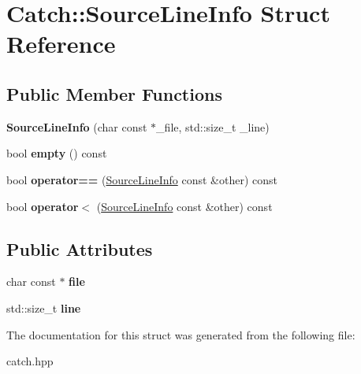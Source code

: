 \hypertarget{structCatch_1_1SourceLineInfo}{}\section{Catch\+:\+:Source\+Line\+Info Struct Reference}
\label{structCatch_1_1SourceLineInfo}
\subsection*{Public Member Functions}
\begin{DoxyCompactItemize}
\item 
\mbox{\label{structCatch_1_1SourceLineInfo_a6218cb890337d37f708ea94063958940}} 
{\bfseries Source\+Line\+Info} (char const $\ast$\+\_\+file, std\+::size\+\_\+t \+\_\+line)
\item 
\mbox{\label{structCatch_1_1SourceLineInfo_a05ab6444e9de7e9c3e76d8aa00093c3a}} 
bool {\bfseries empty} () const
\item 
\mbox{\label{structCatch_1_1SourceLineInfo_a688e761986879266658f000f14ab8a42}} 
bool {\bfseries operator==} (\hyperlink{structCatch_1_1SourceLineInfo}{Source\+Line\+Info} const \&other) const
\item 
\mbox{\label{structCatch_1_1SourceLineInfo_a8b99a0d7b1553d8c2298c694db924be3}} 
bool {\bfseries operator$<$} (\hyperlink{structCatch_1_1SourceLineInfo}{Source\+Line\+Info} const \&other) const
\end{DoxyCompactItemize}
\subsection*{Public Attributes}
\begin{DoxyCompactItemize}
\item 
\mbox{\label{structCatch_1_1SourceLineInfo_ad65537703e9f08c1fa7777fbc3f0c617}} 
char const  $\ast$ {\bfseries file}
\item 
\mbox{\label{structCatch_1_1SourceLineInfo_a841e5d696c7b9cde24e45e61dd979c77}} 
std\+::size\+\_\+t {\bfseries line}
\end{DoxyCompactItemize}


The documentation for this struct was generated from the following file\+:\begin{DoxyCompactItemize}
\item 
catch.\+hpp\end{DoxyCompactItemize}
